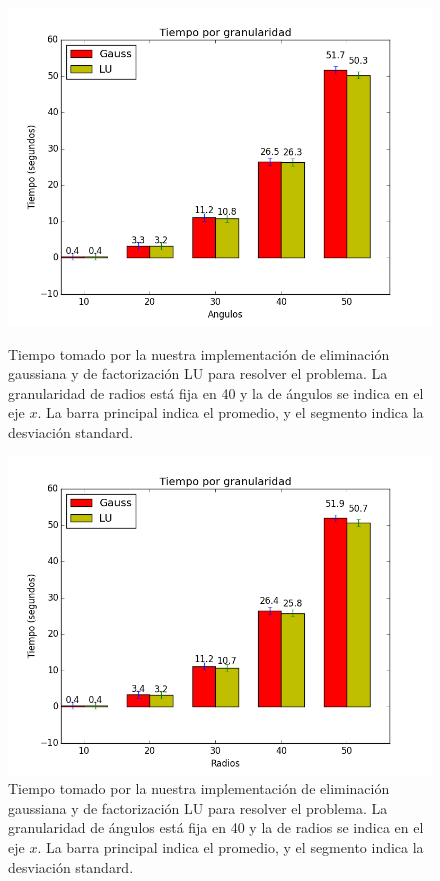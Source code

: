 \begin{figure}[H]
\centering
\begin{minipage}{0.48\textwidth}
  \centering
    \includegraphics[width=1\textwidth]{imgs/tiempos_vanilla_angulos.png}
  \caption{\footnotesize{Tiempo tomado por la nuestra implementación de eliminación gaussiana y de factorización LU para resolver el problema. La granularidad de radios está fija en 40 y la de ángulos se indica en el eje $x$. La barra principal indica el promedio, y el segmento indica la desviación standard.}}
  \label{fig:tiempo1}
\end{minipage}%
\hspace{0.03\textwidth}
\begin{minipage}{0.48\textwidth}   
  \centering
    \includegraphics[width=1\textwidth]{imgs/tiempos_vanilla_radios.png} 
  \caption{\footnotesize{Tiempo tomado por la nuestra implementación de eliminación gaussiana y de factorización LU para resolver el problema. La granularidad de ángulos está fija en 40 y la de radios se indica en el eje $x$. La barra principal indica el promedio, y el segmento indica la desviación standard.}}
  \label{fig:tiempo2}
\end{minipage}
\end{figure}



